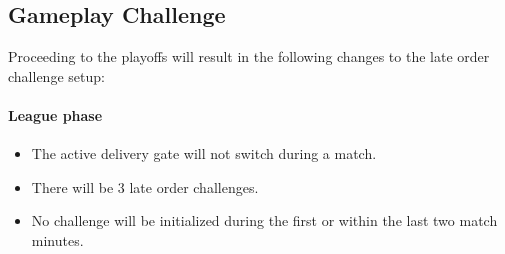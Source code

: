 \documentclass[12pt,twoside]{article}
\begin{document}
\subsection{Gameplay Challenge}
Proceeding to the playoffs will result in the following changes to the
late order challenge setup:

\paragraph{League phase}
\begin{itemize}
\item The active delivery gate will not switch during a match.
\item There will be 3 late order challenges.
\item No challenge will be initialized during the first or within the
  last two match minutes.
\end{itemize} 
\end{document}
